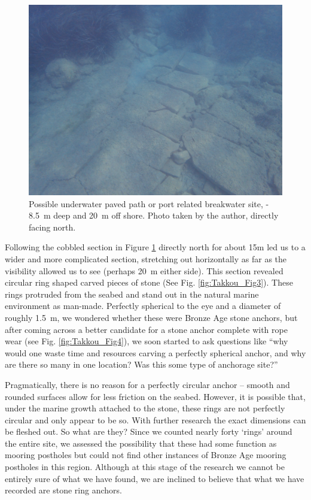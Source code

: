 \begin{figure}
	\includegraphics[width=\linewidth]{figures/takkou_dobroski_Fig2.jpg}
	\centering
	\caption{Possible underwater paved path or port related breakwater site, - \SI{8.5}{\metre} deep and \SI{20}{\metre} off shore. Photo taken by the author, directly facing north.}
	\label{fig:Takkou_Fig2}
\end{figure}

Following the cobbled section in Figure \ref{fig:Takkou_Fig2} directly north for about 15m led us to a wider and more complicated section, stretching out horizontally as far as the visibility allowed us to see (perhaps \SI{20}{\metre} either side). This section revealed circular ring shaped carved pieces of stone (See Fig. \ref{fig:Takkou_Fig3}). These rings protruded from the seabed and stand out in the natural marine environment as man-made. Perfectly spherical to the eye and a diameter of roughly \SI{1.5}{\metre}, we wondered whether these were Bronze Age stone anchors, but after coming across a better candidate for a stone anchor complete with rope wear (see Fig. \ref{fig:Takkou_Fig4}), we soon started to ask questions like “why would one waste time and resources carving a perfectly spherical anchor, and why are there so many in one location? Was this some type of anchorage site?”  

Pragmatically, there is no reason for a perfectly circular anchor – smooth and rounded surfaces allow for less friction on the seabed. However, it is possible that, under the marine growth attached to the stone, these rings are not perfectly circular and only appear to be so. With further research the exact dimensions can be fleshed out. So what are they? Since we counted nearly forty ‘rings’ around the entire site, we assessed the possibility that these had some function as mooring postholes but could not find other instances of Bronze Age mooring postholes in this region. Although at this stage of the research we cannot be entirely sure of what we have found, we are inclined to believe that what we have recorded are stone ring anchors.


